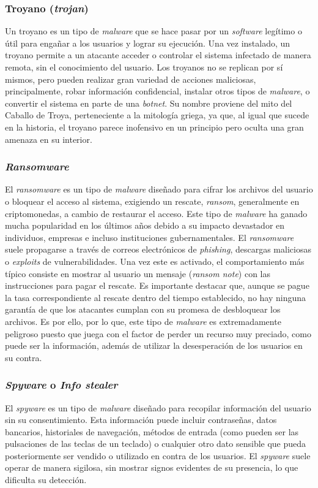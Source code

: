 \subsubsection{Troyano (\textit{trojan})}
Un troyano es un tipo de \textit{malware} que se hace pasar por un \textit{software} legítimo o útil para engañar a los usuarios y lograr su ejecución. Una vez instalado, un troyano permite a un atacante acceder o controlar el sistema infectado de manera remota, sin el conocimiento del usuario. Los troyanos no se replican por sí mismos, pero pueden realizar gran variedad de acciones maliciosas, principalmente, robar información confidencial, instalar otros tipos de \textit{malware}, o convertir el sistema en parte de una \textit{botnet}. Su nombre proviene del mito del Caballo de Troya, perteneciente a la mitología griega, ya que, al igual que sucede en la historia, el troyano parece inofensivo en un principio pero oculta una gran amenaza en su interior.

\subsubsection{\textit{Ransomware}}
El \textit{ransomware} es un tipo de \textit{malware} diseñado para cifrar los archivos del usuario o bloquear el acceso al sistema, exigiendo un rescate, \textit{ransom}, generalmente en criptomonedas, a cambio de restaurar el acceso. Este tipo de \textit{malware} ha ganado mucha popularidad en los últimos años debido a su impacto devastador en individuos, empresas e incluso instituciones gubernamentales. El \textit{ransomware} suele propagarse a través de correos electrónicos de \textit{phishing}, descargas maliciosas o \textit{exploits} de vulnerabilidades. Una vez este es activado, el comportamiento más típico consiste en mostrar al usuario un mensaje (\textit{ransom note}) con las instrucciones para pagar el rescate. Es importante destacar que, aunque se pague la tasa correspondiente al rescate dentro del tiempo establecido, no hay ninguna garantía de que los atacantes cumplan con su promesa de desbloquear los archivos. Es por ello, por lo que, este tipo de \textit{malware} es extremadamente peligroso puesto que juega con el factor de perder un recurso muy preciado, como puede ser la información, además de utilizar la desesperación de los usuarios en su contra.

\subsubsection{\textit{Spyware} o \textit{Info stealer}}
El \textit{spyware} es un tipo de \textit{malware} diseñado para recopilar información del usuario sin su consentimiento. Esta información puede incluir contraseñas, datos bancarios, historiales de navegación, métodos de entrada (como pueden ser las pulsaciones de las teclas de un teclado) o cualquier otro dato sensible que pueda posteriormente ser vendido o utilizado en contra de los usuarios. El \textit{spyware} suele operar de manera sigilosa, sin mostrar signos evidentes de su presencia, lo que dificulta su detección. 


